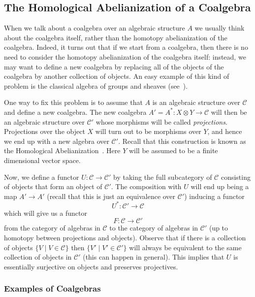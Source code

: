 \documentclass[a4paper,reqno,oneside]{article}
\begin{document}
\subsection{The Homological Abelianization of a Coalgebra}

When we talk about a coalgebra over an algebraic structure $A$ we usually think about the coalgebra itself, rather than the homotopy abelianization of the coalgebra. Indeed, it turns out that if we start from a coalgebra, then there is no need to consider the homotopy abelianization of the coalgebra itself: instead, we may want to define a new coalgebra by replacing all of the objects of the coalgebra by another collection of objects. An easy example of this kind of problem is the classical algebra of groups and sheaves (see~\cite[Section 7.3]{Witten2021}). 

One way to fix this problem is to assume that $A$ is an algebraic structure over $\mathcal{C}$ and define a new coalgebra. The new coalgebra $A' = A^* \colon X \otimes Y \to \mathcal{C}$ will then be an algebraic structure over $\mathcal{C}'$ whose morphisms will be called \textit{projections}. Projections over the object $X$ will turn out to be morphisms over $Y$, and hence we end up with a new algebra over $\mathcal{C}'$. Recall that this construction is known as the Homological Abelianization~\cite{Witten2021}. Here $Y$ will be assumed to be a finite dimensional vector space.

Now, we define a functor $U: \mathcal{C} \to \mathcal{C}'$ by taking the full subcategory of $\mathcal{C}$ consisting of objects that form an object of $\mathcal{C}'$. The composition with $U$ will end up being a map $A' \to A'$ (recall that this is just an equivalence over $\mathcal{C}'$) inducing a functor
\[
U^* \colon \mathcal{C}' \to \mathcal{C}
\]
which will give us a functor 
\[
F: \mathcal{C} \to \mathcal{C}'
\]
from the category of algebras in $\mathcal{C}$ to the category of algebras in $\mathcal{C}'$ (up to homotopy between projections and objects). Observe that if there is a collection of objects $\{V \mid V \in \mathcal{C}\}$ then $\{V' \mid V' \in \mathcal{C}'\}$ will always be equivalent to the same collection of objects in $\mathcal{C}'$ (this can happen in general). This implies that $U$ is essentially surjective on objects and preserves projectives.

\subsubsection{Examples of Coalgebras}
\end{document}
